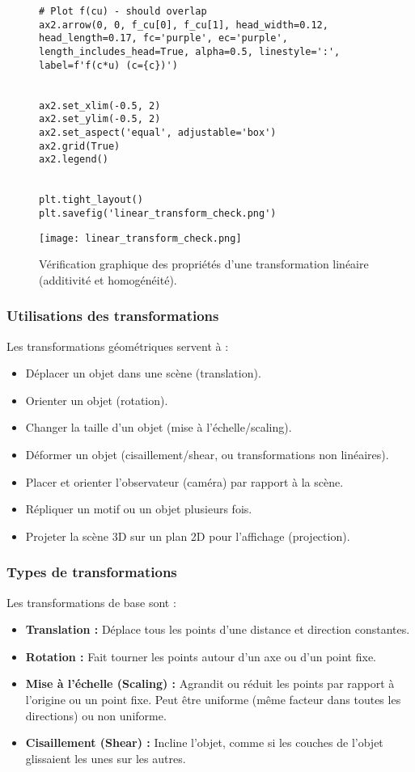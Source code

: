\documentclass{article}
\begin{document}
\begin{figure}[H]
\begin{verbatim}
# Plot f(cu) - should overlap
ax2.arrow(0, 0, f_cu[0], f_cu[1], head_width=0.12, head_length=0.17, fc='purple', ec='purple', length_includes_head=True, alpha=0.5, linestyle=':', label=f'f(c*u) (c={c})')


ax2.set_xlim(-0.5, 2)
ax2.set_ylim(-0.5, 2)
ax2.set_aspect('equal', adjustable='box')
ax2.grid(True)
ax2.legend()


plt.tight_layout()
plt.savefig('linear_transform_check.png')

    \end{verbatim}
    \texttt{[image: linear\_transform\_check.png]}
    \caption{Vérification graphique des propriétés d'une transformation linéaire (additivité et homogénéité).}
    \label{fig:linear_transform_check}
\end{figure}

\subsubsection{Utilisations des transformations}

Les transformations géométriques servent à :
\begin{itemize}
    \item Déplacer un objet dans une scène (translation).
    \item Orienter un objet (rotation).
    \item Changer la taille d'un objet (mise à l'échelle/scaling).
    \item Déformer un objet (cisaillement/shear, ou transformations non linéaires).
    \item Placer et orienter l'observateur (caméra) par rapport à la scène.
    \item Répliquer un motif ou un objet plusieurs fois.
    \item Projeter la scène 3D sur un plan 2D pour l'affichage (projection).
\end{itemize}

\subsubsection{Types de transformations}

Les transformations de base sont :
\begin{itemize}
    \item \textbf{Translation :} Déplace tous les points d'une distance et direction constantes.
    \item \textbf{Rotation :} Fait tourner les points autour d'un axe ou d'un point fixe.
    \item \textbf{Mise à l'échelle (Scaling) :} Agrandit ou réduit les points par rapport à l'origine ou un point fixe. Peut être uniforme (même facteur dans toutes les directions) ou non uniforme.
    \item \textbf{Cisaillement (Shear) :} Incline l'objet, comme si les couches de l'objet glissaient les unes sur les autres.
\end{itemize}
\end{document}
